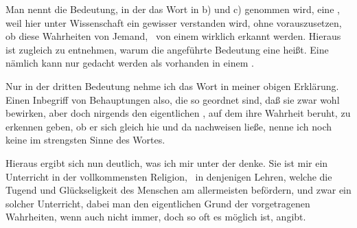 \begin{aufza}
\begin{aufzb}
\end{aufzb}
\begin{RWanm}
Man nennt die Bedeutung, in der das Wort  in b) und c) genommen wird, eine , weil hier unter Wissenschaft ein gewisser  verstanden wird, ohne vorauszusetzen, ob diese Wahrheiten von Jemand, \di\ von einem  wirklich erkannt werden. Hieraus ist zugleich zu entnehmen, warum die  angeführte Bedeutung eine  heißt. Eine  nämlich kann nur gedacht werden als vorhanden in einem .
\end{RWanm}
\item Nur in der dritten  Bedeutung nehme ich das Wort  in meiner obigen Erklärung. Einen Inbegriff von Behauptungen also, die so geordnet sind, daß sie zwar wohl  bewirken, aber doch nirgends den eigentlichen , auf dem ihre Wahrheit beruht, zu erkennen geben, ob er sich gleich hie und da nachweisen ließe, nenne ich noch keine  im strengsten Sinne des Wortes.
\item Hieraus ergibt sich nun deutlich, was ich mir unter der  denke. Sie ist mir ein Unterricht in der vollkommensten Religion, \dh\ in denjenigen Lehren, welche die Tugend und Glückseligkeit des Menschen am allermeisten befördern, und zwar ein solcher Unterricht, dabei man den eigentlichen Grund der vorgetragenen Wahrheiten, wenn auch nicht immer, doch so oft es möglich ist, angibt.
\end{aufza}

